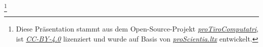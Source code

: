 %
\footnote{\tiny{Diese Präsentation stammt aus dem Open-Source-Projekt
\textit{\href{https://github.com/kreincke/proTiroComputatri}{proTiroComputatri}},
ist \textit{\href{https://creativecommons.org/licenses/by/4.0/}{CC-BY-4.0}} lizenziert 
und wurde auf Basis von \textit{\href{https://github.com/kreincke/proScientia.ltx}{proScientia.ltx}} 
entwickelt.}}
